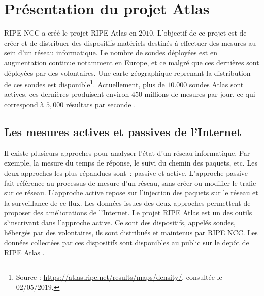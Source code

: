 \section{Présentation du projet  Atlas} \label{ripeatlassection}
RIPE NCC a créé le projet RIPE Atlas en $2010$. L'objectif de ce projet est de créer et de distribuer des dispositifs matériels destinés à effectuer des mesures au sein d'un réseau informatique.  Le nombre de sondes déployées est en augmentation continue notamment en Europe, et ce malgré que ces dernières sont déployées par des volontaires. Une carte géographique reprenant la distribution de ces sondes est disponible\footnote{Source : \url{https://atlas.ripe.net/results/maps/density/}, consultée le $02/05/2019$.}.
Actuellement,  plus de $10.000$ sondes Atlas sont actives, ces dernières produisent environ $450$ millions de mesures par jour, ce qui correspond à  $5,000$ résultats par seconde \cite{WinNT}.


\subsection{Les mesures  actives et passives de l'Internet}
Il existe plusieurs approches pour analyser l'état  d'un réseau informatique. Par exemple, la mesure du temps de réponse, le suivi du chemin des paquets, etc.  Les deux approches les plus répandues sont~:   passive et active. L'approche passive fait référence au processus de mesure d'un réseau, sans créer ou modifier le trafic sur ce réseau.   L'approche active  repose sur l'injection des paquets  sur le réseau et la surveillance  de ce flux.
Les données issues des deux approches permettent de  proposer des améliorations de l'Internet. Le projet RIPE Atlas est un des outils s'inscrivant dans l'approche active. Ce sont  des dispositifs, appelés sondes, hébergés par des volontaires, ils sont distribués et maintenus par  RIPE NCC. Les données collectées par ces dispositifs sont disponibles au public sur le depôt de RIPE Atlas \cite{ripe-atlas-data}.



